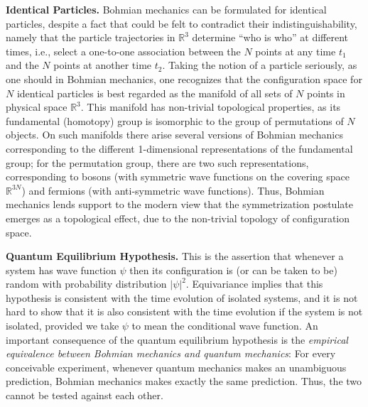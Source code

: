 \documentclass[12pt]{report}
\newcommand{\RRR}{\mathbb{R}}
\begin{document}
\bigskip

\noindent\textbf{Identical Particles.}
Bohmian mechanics can be formulated
for identical particles, despite a fact that could be felt to
contradict their indistinguishability, namely that the particle
trajectories in $\RRR^3$ determine ``who is who'' at different
times, i.e., select a one-to-one association between the $N$
points at any time $t_1$ and the $N$ points at another time $t_2$.
Taking the notion of a particle seriously, as one should in Bohmian mechanics,
one recognizes that the configuration space for $N$ identical particles is
best regarded as the manifold of all sets of $N$ points in physical space $\RRR^3$.
This manifold has non-trivial topological properties, as its
fundamental (homotopy) group is isomorphic to the group
of permutations of $N$ objects. On such manifolds
there arise several versions of Bohmian mechanics corresponding to the
different 1-dimensional representations of the fundamental group; for the permutation group, there are two such
representations, corresponding to bosons (with symmetric wave functions on the covering space $\RRR^{3N}$) and fermions (with anti-symmetric wave functions).
Thus, Bohmian mechanics lends support to the
modern view  that the symmetrization postulate emerges as
a topological effect, due to the non-trivial topology of configuration space.

\bigskip

\noindent\textbf{Quantum Equilibrium Hypothesis. } This is the assertion that whenever a system has wave function $\psi$ then its configuration is (or can be taken to be) random with probability distribution $|\psi|^2$. Equivariance implies that this hypothesis is consistent with the time evolution of isolated systems, and it is not hard to show that it is also consistent with the time evolution if the system is not isolated, provided we take $\psi$ to mean the conditional wave function. An important consequence of the quantum equilibrium hypothesis is the \emph{empirical equivalence between Bohmian mechanics and quantum mechanics}: For every conceivable experiment, whenever quantum mechanics makes an unambiguous prediction, Bohmian mechanics makes exactly the same prediction. Thus, the two cannot be tested against each other. %
\end{document}
